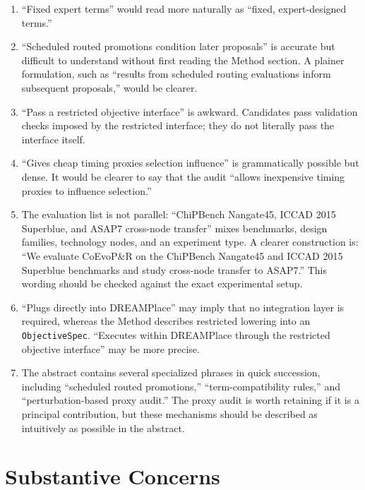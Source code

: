 \documentclass[11pt]{article}
\begin{document}
\begin{enumerate}
  \item ``Fixed expert terms'' would read more naturally as ``fixed,
  expert-designed terms.''

  \item ``Scheduled routed promotions condition later proposals'' is accurate
  but difficult to understand without first reading the Method section. A
  plainer formulation, such as ``results from scheduled routing evaluations
  inform subsequent proposals,'' would be clearer.

  \item ``Pass a restricted objective interface'' is awkward. Candidates pass
  validation checks imposed by the restricted interface; they do not literally
  pass the interface itself.

  \item ``Gives cheap timing proxies selection influence'' is grammatically
  possible but dense. It would be clearer to say that the audit ``allows
  inexpensive timing proxies to influence selection.''

  \item The evaluation list is not parallel: ``ChiPBench Nangate45, ICCAD 2015
  Superblue, and ASAP7 cross-node transfer'' mixes benchmarks, design families,
  technology nodes, and an experiment type. A clearer construction is:
  ``We evaluate CoEvoP\&R on the ChiPBench Nangate45 and ICCAD 2015 Superblue
  benchmarks and study cross-node transfer to ASAP7.'' This wording should be
  checked against the exact experimental setup.

  \item ``Plugs directly into DREAMPlace'' may imply that no integration layer
  is required, whereas the Method describes restricted lowering into an
  \texttt{ObjectiveSpec}. ``Executes within DREAMPlace through the restricted
  objective interface'' may be more precise.

  \item The abstract contains several specialized phrases in quick succession,
  including ``scheduled routed promotions,'' ``term-compatibility rules,'' and
  ``perturbation-based proxy audit.'' The proxy audit is worth retaining if it
  is a principal contribution, but these mechanisms should be described as
  intuitively as possible in the abstract.
\end{enumerate}

\section{Substantive Concerns}
\end{document}
